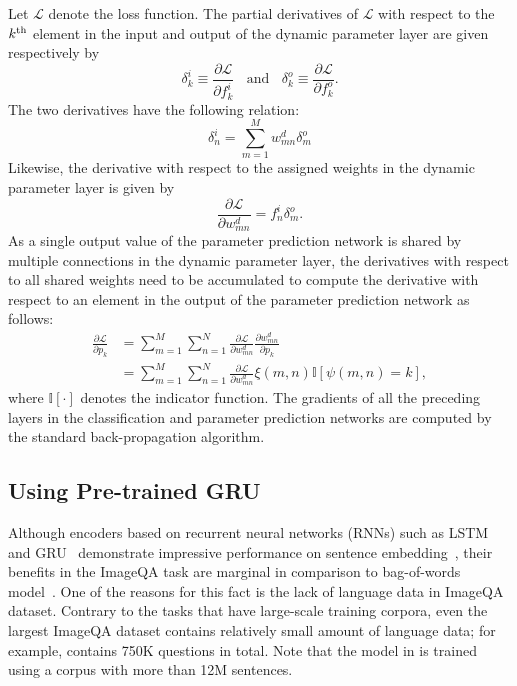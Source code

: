 \documentclass[10pt,twocolumn,letterpaper]{article}
\begin{document}
Let ${\mathcal{L}}$ denote the loss function.
The partial derivatives of ${\mathcal{L}}$ with respect to the $k^{\rm th}$ element in the input and output of the dynamic parameter layer are given respectively by 
\begin{equation}
{\delta}^{i}_k \equiv \frac{\partial\mathcal{L}}{\partial {f}^{i}_k}  ~~~~\text{and}~~~~
{\delta}^{o}_k \equiv \frac{\partial\mathcal{L}}{\partial {f}^{o}_k}.
\end{equation}
The two derivatives have the following relation:
\begin{equation}
{\delta}^{i}_n = \sum _{ m=1 }^{ M }{ w^d_{mn}\delta^o_{m} } 
\end{equation}
Likewise, the derivative with respect to the assigned weights in the dynamic parameter layer is given by
\begin{equation}
{\frac{\partial\mathcal{L}}{\partial w^{d}_{mn}}}=f^{i}_{n}{\delta}^{o}_{m}.
\end{equation}
As a single output value of the parameter prediction network is shared by multiple connections in the dynamic parameter layer, the derivatives with respect to all shared weights need to be accumulated to compute the derivative with respect to an element in the output of the parameter prediction network as follows:
\begin{align}
{\frac{\partial\mathcal{L}}{\partial p_{k}}}
&= \sum _{m=1}^{\scriptscriptstyle M}{\sum _{n=1}^{\scriptscriptstyle N}{   {\frac{\partial\mathcal{L}}{\partial w^d_{mn}}} {\frac{\partial w^d_{mn}}{\partial p_{k}}}}}  \nonumber \\
&= \sum _{m=1}^{\scriptscriptstyle M}{\sum _{n=1}^{\scriptscriptstyle N} {  {\frac{\partial\mathcal{L}}{\partial w^d_{mn}}}   {\xi(m,n)}  {{\mathbb{I}} [ \psi(m,n)=k ]}      }},
\end{align}
where ${\mathbb{I}} [ \cdot ]$ denotes the indicator function.
The gradients of all the preceding layers in the classification and parameter prediction networks are computed by the standard back-propagation algorithm.


\subsection{Using Pre-trained GRU}


Although encoders based on recurrent neural networks (RNNs) such as LSTM~\cite{LSTM} and GRU~\cite{chung2014empirical} demonstrate impressive performance on sentence embedding~\cite{mikolov2010recurrent, sutskever2014sequence}, their benefits in the ImageQA task are marginal in comparison to bag-of-words model~\cite{mren2015}.
One of the reasons for this fact is the lack of language data in ImageQA dataset.
Contrary to the tasks that have large-scale training corpora, even the largest ImageQA dataset contains relatively small amount of language data; for example, \cite{VQA} contains 750K questions in total.
Note that the model in \cite{sutskever2014sequence} is trained using a corpus with more than 12M sentences.
\end{document}
